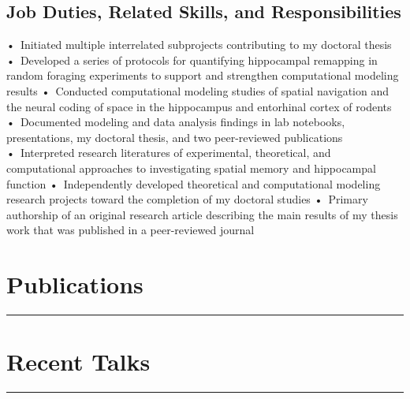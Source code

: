 \documentclass[10pt]{article}
\newcommand{\itemnote}[1]{
  \begin{description}
    \item[$\rightarrow$] \hspace{.09in}{\color{darkgray}\it #1}
  \end{description}
}
\newcommand{\newsection}[1]{%
  \section*{#1}
  \vspace{-.125in}
  \hrule
  \vspace{.25in}
  \label{sec:#1}
}
\begin{document}
\subsection*{Job Duties, Related Skills, and Responsibilities}

\quad •~Initiated multiple interrelated subprojects contributing to my doctoral thesis
•~Developed a series of protocols for quantifying hippocampal remapping in random foraging experiments to support and strengthen computational modeling results
•~Conducted computational modeling studies of spatial navigation and the neural coding of space in the hippocampus and entorhinal cortex of rodents
•~Documented modeling and data analysis findings in lab notebooks, presentations, my doctoral thesis, and two peer-reviewed publications
•~Interpreted research literatures of experimental, theoretical, and computational approaches to investigating spatial memory and hippocampal function
•~Independently developed theoretical and computational modeling research projects toward the completion of my doctoral studies
•~Primary authorship of an original research article describing the main results of my thesis work that was published in a peer-reviewed journal


\pagebreak
\newsection{Publications}

\renewcommand{\itemnote}[1]{}



\renewcommand{\itemnote}[1]{
  \begin{description}
    \item[$\rightarrow$] \hspace{.09in}{\color{darkgray}\it #1}
  \end{description}
}


\newsection{Recent Talks}
\end{document}
